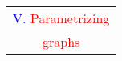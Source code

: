 \documentclass[%
pdf,
colorBG,
slideColor,
]{prosper}
\begin{document}















\begin{slide}{}
\begin{center}
{\Huge 
\begin{tabular*}{7cm}{c}
\\[-0.4cm]
\textcolor{blue}{V. }\textcolor{red}{Parametrizing}\\
\textcolor{red}{graphs}
\end{tabular*}
}
\end{center}
\end{slide}
\end{document}
